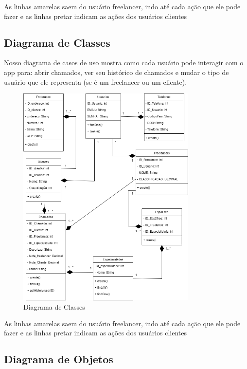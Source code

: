\documentclass[
  a4paper,%
  12pt,%
  english,%
  brazilian,%
]{article}
\begin{document}
    As linhas amarelas saem do usuário freelancer, indo até cada ação que ele pode fazer e as linhas pretar indicam as ações dos usuários clientes

\break

\subsection*{Diagrama de Classes}

    Nosso diagrama de casos de uso mostra como cada usuário pode interagir com o app para: abrir chamados, ver seu histórico de chamados e mudar o tipo de usuário que ele representa (se é um freelancer ou um cliente).

\begin{figure}[h]
\centering
\caption{Diagrama de Classes}%
\label{fig:diagrama-classe}
 \includegraphics[width=0.8\textwidth]{fotos/diagramaClassePI.png}
\end{figure}

    As linhas amarelas saem do usuário freelancer, indo até cada ação que ele pode fazer e as linhas pretar indicam as ações dos usuários clientes

\break

\subsection*{Diagrama de Objetos}
\end{document}
